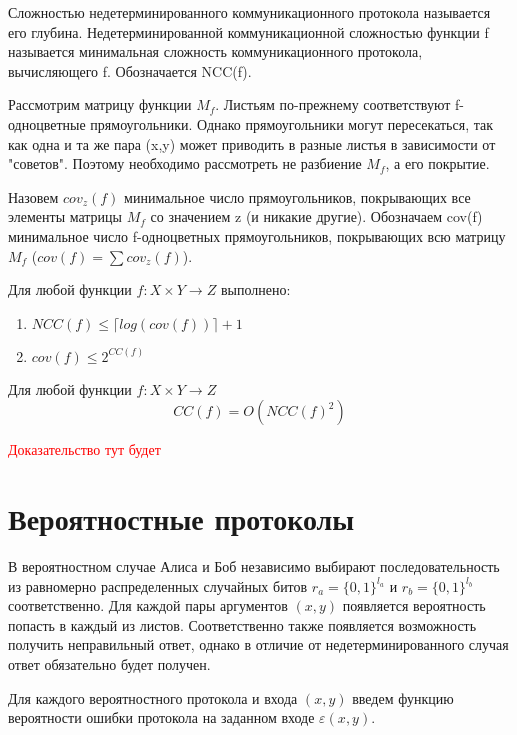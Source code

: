\documentclass[12pt]{article}
\begin{document}
\begin{Def}
Сложностью недетерминированного коммуникационного протокола называется его глубина.
Недетерминированной коммуникационной сложностью функции f называется минимальная сложность коммуникационного протокола, вычисляющего f. Обозначается NCC(f).
\end{Def}

Рассмотрим матрицу функции $M_f$. Листьям по-прежнему соответствуют f-одноцветные прямоугольники.
Однако прямоугольники могут пересекаться, так как одна и та же пара (x,y) может приводить в разные листья в зависимости от "советов".
Поэтому необходимо рассмотреть не разбиение $M_f$, а его покрытие.

\begin{Def}
Назовем $cov_z(f)$ минимальное число прямоугольников,
покрывающих все элементы матрицы $M_f$ со значением z
(и никакие другие). Обозначаем cov(f) минимальное число f-одноцветных прямоугольников, покрывающих всю
матрицу $M_f$ ($cov(f) = \sum cov_z(f)$).
\end{Def}

\begin{Statement}
Для любой функции $f \colon X \times Y \rightarrow Z$ выполнено:
\begin{enumerate}
    \item
    $NCC(f) \leq \lceil log(cov(f)) \rceil + 1$
    \item
    $cov(f) \leq 2^{CC(f)}$
\end{enumerate}
\end{Statement}

\begin{Th}
    Для любой функции $f \colon X \times Y \rightarrow Z$
    $$CC(f) = O(NCC(f)^2)$$
\end{Th}
\textcolor{red}{Доказательство тут будет}

\section{Вероятностные протоколы}
В вероятностном случае Алиса и Боб независимо выбирают последовательность из равномерно распределенных случайных битов
$r_a=\{0, 1\}^{l_a}$ и $r_b=\{0, 1\}^{l_b}$ соответственно. Для каждой пары аргументов $(x,y)$ появляется вероятность попасть в каждый из листов. Соответственно также появляется возможность получить неправильный ответ, однако в отличие от недетерминированного случая ответ обязательно будет получен.

\begin{Def}
Для каждого вероятностного протокола и входа $(x,y)$ введем функцию вероятности ошибки протокола на заданном входе $\varepsilon(x,y)$.
\end{Def}
\end{document}
